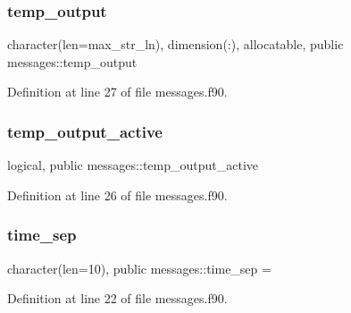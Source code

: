 \subsubsection{\texorpdfstring{temp\+\_\+output}{temp\_output}}
{\footnotesize\ttfamily character(len=max\+\_\+str\+\_\+ln), dimension(\+:), allocatable, public messages\+::temp\+\_\+output}



Definition at line 27 of file messages.\+f90.

\mbox{\label{namespacemessages_ace8877914cfa5253cc002da0f387446a}} 
\subsubsection{\texorpdfstring{temp\+\_\+output\+\_\+active}{temp\_output\_active}}
{\footnotesize\ttfamily logical, public messages\+::temp\+\_\+output\+\_\+active}



Definition at line 26 of file messages.\+f90.

\mbox{\label{namespacemessages_abeb2abf0ac1d1fb4f09d881eb57b3dae}} 
\subsubsection{\texorpdfstring{time\+\_\+sep}{time\_sep}}
{\footnotesize\ttfamily character(len=10), public messages\+::time\+\_\+sep = \textquotesingle{}\textquotesingle{}}



Definition at line 22 of file messages.\+f90.

